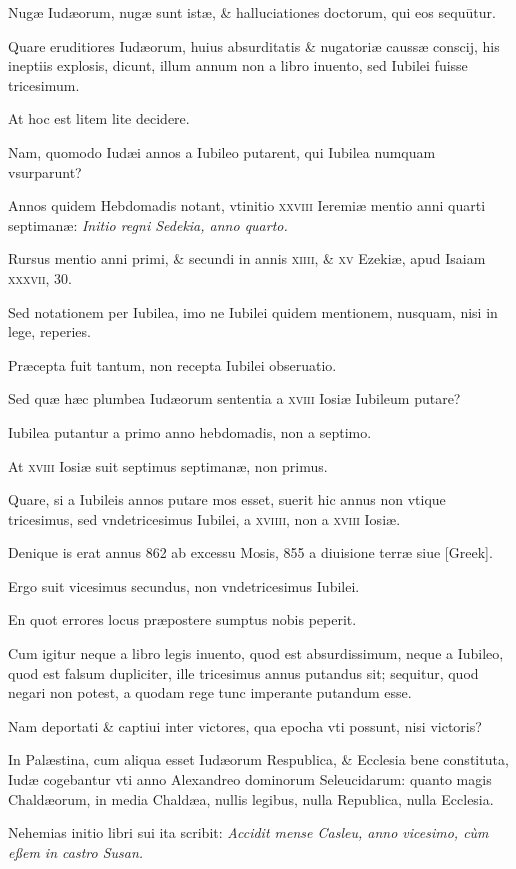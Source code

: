 \begin{parnumbers}
Nugæ Iudæorum,
nugæ sunt istæ, \& halluciationes doctorum, qui eos sequūtur.

Quare eruditiores Iudæorum, huius absurditatis \& nugatoriæ
caussæ conscij, his ineptiis explosis, dicunt, illum annum non a
libro inuento, sed Iubilei fuisse tricesimum.

At hoc est litem lite decidere.

Nam, quomodo Iudæi annos a Iubileo putarent, qui Iubilea
numquam vsurparunt?

Annos quidem Hebdomadis notant, vtinitio
\textsc{xxviii} Ieremiæ mentio anni quarti septimanæ: \textit{Initio regni
Sedekia, anno quarto.}

Rursus mentio anni primi, \& secundi in annis
\textsc{xiiii}, \& \textsc{xv} Ezekiæ, apud Isaiam \textsc{xxxvii}, 30.

Sed notationem
per Iubilea, imo ne Iubilei quidem mentionem, nusquam, nisi
in lege, reperies.

Præcepta fuit tantum, non recepta Iubilei obseruatio.

Sed quæ hæc plumbea Iudæorum sententia a \textsc{xviii} Iosiæ
Iubileum putare?

Iubilea putantur a primo anno hebdomadis, non
a septimo.

At \textsc{xviii} Iosiæ suit septimus septimanæ, non primus.

Quare, si a Iubileis annos putare mos esset, suerit hic annus non vtique
tricesimus, sed vndetricesimus Iubilei, a \textsc{xviiii}, non a
\textsc{xviii} Iosiæ.

Denique is erat annus 862 ab excessu Mosis, 855 a
diuisione terræ siue \textgreek{[Greek]}.

Ergo suit vicesimus secundus, non
vndetricesimus Iubilei.

En quot errores locus præpostere sumptus
nobis peperit.

Cum igitur neque a libro legis inuento, quod est absurdissimum,
neque a Iubileo, quod est falsum dupliciter, ille tricesimus
annus putandus sit; sequitur, quod negari non potest, a
quodam rege tunc imperante putandum esse.

Nam deportati \& captiui
inter victores, qua epocha vti possunt, nisi victoris?

In Palæstina,
cum aliqua esset Iudæorum Respublica, \& Ecclesia bene constituta,
Iudæ cogebantur vti anno Alexandreo dominorum Seleucidarum:
quanto magis Chaldæorum, in media Chaldæa, nullis legibus,
nulla Republica, nulla Ecclesia.

Nehemias initio libri sui ita
scribit: \textit{Accidit mense Casleu, anno vicesimo, cùm eßem in castro Susan.}


\end{parnumbers}
